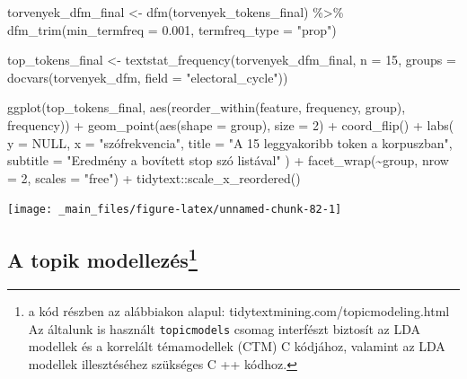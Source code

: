 \documentclass[
]{book}
\newenvironment{Shaded}{\begin{snugshade}}{\end{snugshade}}
\newcommand{\AttributeTok}[1]{\textcolor[rgb]{0.77,0.63,0.00}{#1}}
\newcommand{\ConstantTok}[1]{\textcolor[rgb]{0.00,0.00,0.00}{#1}}
\newcommand{\DecValTok}[1]{\textcolor[rgb]{0.00,0.00,0.81}{#1}}
\newcommand{\FloatTok}[1]{\textcolor[rgb]{0.00,0.00,0.81}{#1}}
\newcommand{\FunctionTok}[1]{\textcolor[rgb]{0.00,0.00,0.00}{#1}}
\newcommand{\NormalTok}[1]{#1}
\newcommand{\OtherTok}[1]{\textcolor[rgb]{0.56,0.35,0.01}{#1}}
\newcommand{\SpecialCharTok}[1]{\textcolor[rgb]{0.00,0.00,0.00}{#1}}
\newcommand{\StringTok}[1]{\textcolor[rgb]{0.31,0.60,0.02}{#1}}
\begin{document}
\begin{Shaded}
\begin{Highlighting}[]
\NormalTok{torvenyek\_dfm\_final }\OtherTok{\textless{}{-}} \FunctionTok{dfm}\NormalTok{(torvenyek\_tokens\_final) }\SpecialCharTok{\%\textgreater{}\%}
  \FunctionTok{dfm\_trim}\NormalTok{(}\AttributeTok{min\_termfreq =} \FloatTok{0.001}\NormalTok{, }\AttributeTok{termfreq\_type =} \StringTok{"prop"}\NormalTok{)}

\NormalTok{top\_tokens\_final }\OtherTok{\textless{}{-}} \FunctionTok{textstat\_frequency}\NormalTok{(torvenyek\_dfm\_final, }\AttributeTok{n =} \DecValTok{15}\NormalTok{, }\AttributeTok{groups =} \FunctionTok{docvars}\NormalTok{(torvenyek\_dfm, }\AttributeTok{field =} \StringTok{"electoral\_cycle"}\NormalTok{))}

\FunctionTok{ggplot}\NormalTok{(top\_tokens\_final, }\FunctionTok{aes}\NormalTok{(}\FunctionTok{reorder\_within}\NormalTok{(feature, frequency, group), frequency)) }\SpecialCharTok{+}
  \FunctionTok{geom\_point}\NormalTok{(}\FunctionTok{aes}\NormalTok{(}\AttributeTok{shape =}\NormalTok{ group), }\AttributeTok{size =} \DecValTok{2}\NormalTok{) }\SpecialCharTok{+}
  \FunctionTok{coord\_flip}\NormalTok{() }\SpecialCharTok{+}
  \FunctionTok{labs}\NormalTok{(}
    \AttributeTok{y =} \ConstantTok{NULL}\NormalTok{,}
    \AttributeTok{x =} \StringTok{"szófrekvencia"}\NormalTok{,}
    \AttributeTok{title =} \StringTok{"A 15 leggyakoribb token a korpuszban"}\NormalTok{,}
    \AttributeTok{subtitle =} \StringTok{"Eredmény a bovített stop szó listával"}
\NormalTok{  ) }\SpecialCharTok{+}
  \FunctionTok{facet\_wrap}\NormalTok{(}\SpecialCharTok{\textasciitilde{}}\NormalTok{group, }\AttributeTok{nrow =} \DecValTok{2}\NormalTok{, }\AttributeTok{scales =} \StringTok{"free"}\NormalTok{) }\SpecialCharTok{+}
\NormalTok{  tidytext}\SpecialCharTok{::}\FunctionTok{scale\_x\_reordered}\NormalTok{()}
\end{Highlighting}
\end{Shaded}

\begin{center}\texttt{[image: \_main\_files/figure-latex/unnamed-chunk-82-1]} \end{center}

\hypertarget{a-topik-modellezuxe9s-klasztering_topicmodellek-2}{%
\subsection[A topik modellezés]{\texorpdfstring{A topik
modellezés\footnote{a kód részben az alábbiakon alapul:
  tidytextmining.com/topicmodeling.html Az általunk is használt
  \texttt{topicmodels} csomag interfészt biztosít az LDA modellek és a
  korrelált témamodellek (CTM) C kódjához, valamint az LDA modellek
  illesztéséhez szükséges C ++ kódhoz.}}{A topik modellezés}}\label{a-topik-modellezuxe9s-klasztering_topicmodellek-2}}
\end{document}
